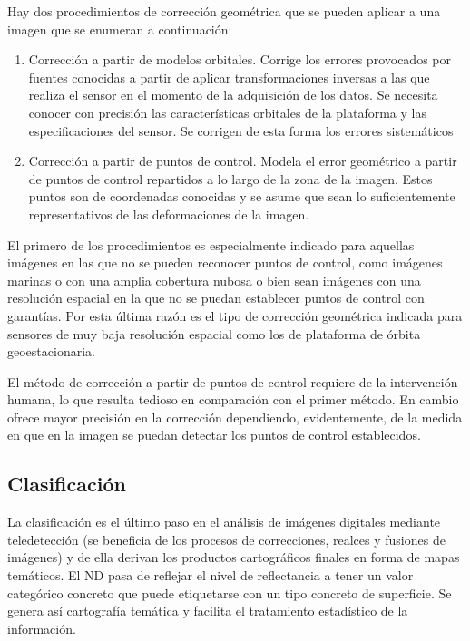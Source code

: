 Hay dos procedimientos de corrección geométrica que se pueden aplicar a una imagen que se enumeran a continuación:

\begin{enumerate}
	\item Corrección a partir de modelos orbitales. Corrige los errores provocados por fuentes conocidas a partir de aplicar transformaciones inversas a las que realiza el sensor en el momento de la adquisición de los datos. Se necesita conocer con precisión las características orbitales de la plataforma y las especificaciones del sensor. Se corrigen de esta forma los errores sistemáticos
	\item Corrección a partir de puntos de control. Modela el error geométrico a partir de puntos de control repartidos a lo largo de la zona de la imagen. Estos puntos son de coordenadas conocidas y se asume que sean lo suficientemente representativos de las deformaciones de la imagen.
\end{enumerate}

El primero de los procedimientos es especialmente indicado para aquellas imágenes en las que no se pueden reconocer puntos de control, como imágenes marinas o con una amplia cobertura nubosa o bien sean imágenes con una resolución espacial en la que no se puedan establecer puntos de control con garantías. Por esta última razón es el tipo de corrección geométrica indicada para sensores de muy baja resolución espacial como los de plataforma de órbita geoestacionaria.%

El método de corrección a partir de puntos de control requiere de la intervención humana, lo que resulta tedioso en comparación con el primer método. En cambio ofrece mayor precisión en la corrección dependiendo, evidentemente, de la medida en que en la imagen se puedan detectar los puntos de control establecidos.%

\subsection{Clasificación}
La clasificación es el último paso en el análisis de imágenes digitales mediante teledetección (se beneficia de los procesos de correcciones, realces y fusiones de imágenes) y de ella derivan los productos cartográficos finales en forma de mapas temáticos. El \ac{ND} pasa de reflejar el nivel de reflectancia a tener un valor categórico concreto que puede etiquetarse con un tipo concreto de superficie. Se genera así cartografía temática y facilita el tratamiento estadístico de la información.%


